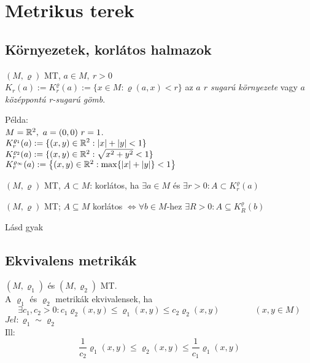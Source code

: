 \section{Metrikus terek}
\subsection{Környezetek, korlátos halmazok}

\begin{de}[Környezet]
  $(M,\varrho)$ MT, $a\in M,\ r>0$\\
  $K_r(a) := K_r^\varrho (a) := \{x\in M: \varrho(a,x) < r\}$
  az \emph{$a$ $r$ sugarú környezete} vagy \emph{$a$ középpontú
    r-sugarú gömb}.
\end{de}

Példa:\\
$M=\mathbb{R}^2,\ a=(0,0)\ r=1$.\\
$\displaystyle K_r^{\varrho_1}(a) :=\{(x,y)\in\mathbb{R}^2 : |x| + |y| < 1\}$\\
$K_r^{\varrho_2}(a) :=\{(x,y)\in\mathbb{R}^2 : \sqrt{x^2 + y^2} < 1\}$\\
$K_r^{\varrho_\infty}(a) :=\big\{(x,y)\in\mathbb{R}^2 : \max\{ |x| + |y|\} < 1\big\}$\\


\begin{de}
  $(M, \varrho)$ MT, $A\subset M$: korlátos, ha
  $\exists a \in M$ és $\exists r > 0: A\subset K_r^\varrho (a)$
\end{de}

\begin{te}
  $(M, \varrho)$ MT; $A\subseteq M$ korlátos $\Leftrightarrow
  \forall b \in M$-hez $\exists R>0\colon A\subseteq K_R^\varrho (b)
  $
\end{te}
\begin{biz}
  Lásd gyak
\end{biz}

\subsection{Ekvivalens metrikák}
\begin{de}
  $(M,\varrho_1)$ és $(M,\varrho_2)$ MT.\\
  A $\varrho_1$ és $\varrho_2$ metrikák ekvivalensek, ha
  \[\exists c_1,c_2>0\colon
  c_1\varrho_2(x,y)\leq \varrho_1(x,y)\leq c_2\varrho_2(x,y)\qquad\qquad(x,y\in M)\]
  $Jel: \varrho_1\sim\varrho_2$\\Ill:
  \[\dfrac1{c_2}\varrho_1(x,y)\leq\varrho_2(x,y)\leq \dfrac1{c_1}\varrho_1(x,y)\]
\end{de}

